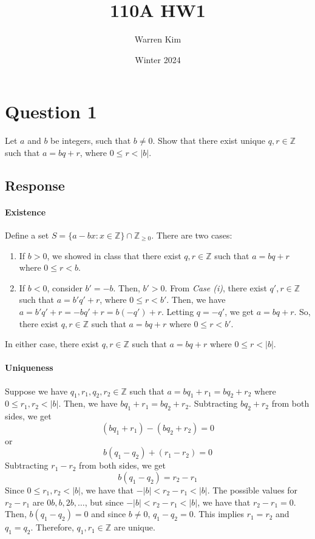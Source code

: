 \documentclass [12pt] {article}
\title{110A HW1}
\author{Warren Kim}
\date{Winter 2024}
\newcommand{\Z}{\mathbb{Z}}
\begin{document}
\maketitle

\section*{Question 1}
Let $a$ and $b$ be integers, such that $b \neq 0$. Show that there exist unique $q, r \in \Z$ such 
that $a = bq + r$, where $0 \leq r < |b|$. 

\subsection*{Response}
\paragraph{Existence}
Define a set $S = \{a - bx : x \in \Z\} \cap \Z_{\geq 0}$. There are two cases:
\begin{enumerate}[label=\textit{Case (\roman*):},leftmargin=*]
    \item If $b > 0$, we showed in class that there exist $q, r \in \Z$ such that $a = bq + r$
        where $0 \leq r < b$.
    \item If $b < 0$, consider $b' = -b$. Then, $b' > 0$. From \textit{Case (i)}, there exist 
        $q', r \in \Z$ such that $a = b'q' + r$, where $0 \leq r < b'$. Then, we have
        $a = b'q' + r = -bq' + r = b(-q') + r$. Letting $q = -q'$, we get $a = bq + r$. So, there 
        exist $q, r \in \Z$ such that $a = bq + r$ where $0 \leq r < b'$.
\end{enumerate}
In either case, there exist $q, r \in \Z$ such that $a = bq + r$ where $0 \leq r < |b|$.

\paragraph{Uniqueness}
Suppose we have $q_1, r_1, q_2, r_2 \in \Z$ such that $a = bq_1 + r_1 = bq_2 + r_2$ where 
$0 \leq r_1, r_2 < |b|$. Then, we have $bq_1 + r_1 = bq_2 + r_2$. Subtracting $bq_2 + r_2$ from 
both sides, we get
\[(bq_1 + r_1) - (bq_2 + r_2) = 0\]
or 
\[b(q_1 - q_2) + (r_1 - r_2) = 0\]
Subtracting $r_1 - r_2$ from both sides, we get
\[b(q_1 - q_2) = r_2 - r_1\]
Since $0 \leq r_1, r_2 < |b|$, we have that $-|b| < r_2 - r_1 < |b|$. The possible values for
$r_2 - r_1$ are $0b, b, 2b, \ldots$, but since $-|b| < r_2 - r_1 < |b|$, we have that
$r_2 - r_1 = 0$. Then, $b(q_1 - q_2) = 0$ and since $b \neq 0$, $q_1 - q_2 = 0$. This implies
$r_1 = r_2$ and $q_1 = q_2$. Therefore, $q_1, r_1 \in \Z$ are unique.
\newpage
\end{document}

